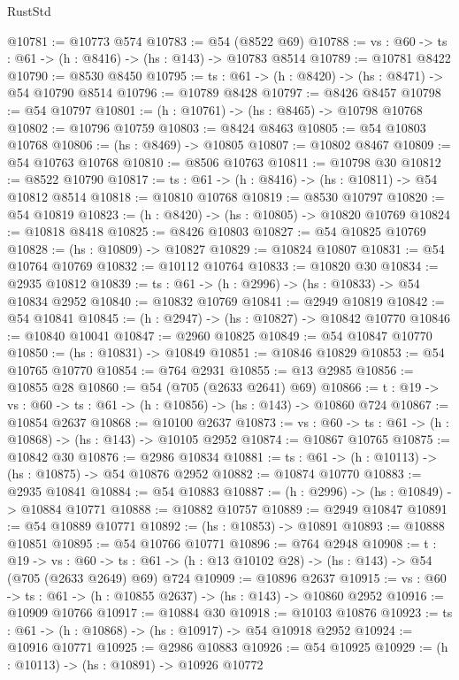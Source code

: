 \begin{lexlean}{RustStd}
\begin{coremodule}
@10781 := @10773 @574
@10783 := @54 (@8522 @69)
@10788 := {vs : @60} -> {ts : @61} -> (h : @8416) -> (hs : @143) -> @10783 @8514
@10789 := @10781 @8422
@10790 := @8530 @8450
@10795 := {ts : @61} -> (h : @8420) -> (hs : @8471) -> @54 @10790 @8514
@10796 := @10789 @8428
@10797 := @8426 @8457
@10798 := @54 @10797
@10801 := (h : @10761) -> (hs : @8465) -> @10798 @10768
@10802 := @10796 @10759
@10803 := @8424 @8463
@10805 := @54 @10803 @10768
@10806 := (hs : @8469) -> @10805
@10807 := @10802 @8467
@10809 := @54 @10763 @10768
@10810 := @8506 @10763
@10811 := @10798 @30
@10812 := @8522 @10790
@10817 := {ts : @61} -> (h : @8416) -> (hs : @10811) -> @54 @10812 @8514
@10818 := @10810 @10768
@10819 := @8530 @10797
@10820 := @54 @10819
@10823 := (h : @8420) -> (hs : @10805) -> @10820 @10769
@10824 := @10818 @8418
@10825 := @8426 @10803
@10827 := @54 @10825 @10769
@10828 := (hs : @10809) -> @10827
@10829 := @10824 @10807
@10831 := @54 @10764 @10769
@10832 := @10112 @10764
@10833 := @10820 @30
@10834 := @2935 @10812
@10839 := {ts : @61} -> (h : @2996) -> (hs : @10833) -> @54 @10834 @2952
@10840 := @10832 @10769
@10841 := @2949 @10819
@10842 := @54 @10841
@10845 := (h : @2947) -> (hs : @10827) -> @10842 @10770
@10846 := @10840 @10041
@10847 := @2960 @10825
@10849 := @54 @10847 @10770
@10850 := (hs : @10831) -> @10849
@10851 := @10846 @10829
@10853 := @54 @10765 @10770
@10854 := @764 @2931
@10855 := @13 @2985
@10856 := @10855 @28
@10860 := @54 (@705 (@2633 @2641) @69)
@10866 := {t : @19} -> {vs : @60} -> {ts : @61} -> (h : @10856) -> (hs : @143) -> @10860 @724
@10867 := @10854 @2637
@10868 := @10100 @2637
@10873 := {vs : @60} -> {ts : @61} -> (h : @10868) -> (hs : @143) -> @10105 @2952
@10874 := @10867 @10765
@10875 := @10842 @30
@10876 := @2986 @10834
@10881 := {ts : @61} -> (h : @10113) -> (hs : @10875) -> @54 @10876 @2952
@10882 := @10874 @10770
@10883 := @2935 @10841
@10884 := @54 @10883
@10887 := (h : @2996) -> (hs : @10849) -> @10884 @10771
@10888 := @10882 @10757
@10889 := @2949 @10847
@10891 := @54 @10889 @10771
@10892 := (hs : @10853) -> @10891
@10893 := @10888 @10851
@10895 := @54 @10766 @10771
@10896 := @764 @2948
@10908 := {t : @19} ->
  {vs : @60} ->
  {ts : @61} -> (h : @13 @10102 @28) -> (hs : @143) -> @54 (@705 (@2633 @2649) @69) @724
@10909 := @10896 @2637
@10915 := {vs : @60} -> {ts : @61} -> (h : @10855 @2637) -> (hs : @143) -> @10860 @2952
@10916 := @10909 @10766
@10917 := @10884 @30
@10918 := @10103 @10876
@10923 := {ts : @61} -> (h : @10868) -> (hs : @10917) -> @54 @10918 @2952
@10924 := @10916 @10771
@10925 := @2986 @10883
@10926 := @54 @10925
@10929 := (h : @10113) -> (hs : @10891) -> @10926 @10772

\end{coremodule}
\end{lexlean}
